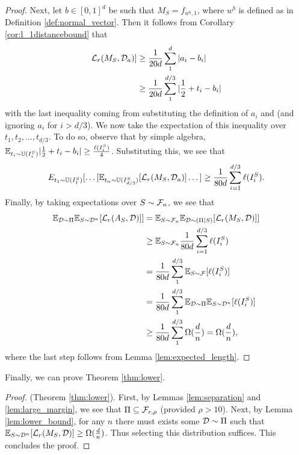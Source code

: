 \begin{proof}
Next, let $b \in [0, 1]^d$ be such that $M_S = f_{w^b, 1}$, where $w^b$ is defined as in Definition \ref{def:normal_vector}. Then it follows from Corollary \ref{cor:l_1distancebound} that 
\begin{equation*}
\begin{split}
\mathcal L_r(M_S, {\mathcal D}_a)] &\geq \frac{1}{20d}\sum_1^d |a_i - b_i| \\
&\geq \frac{1}{20d}\sum_1^{d/3} |\frac{1}{2} + t_i - b_i|
\end{split}
\end{equation*}
with the last inequality coming from substituting the definition of $a_i$ and (and ignoring $a_i$ for $i > d/3$). We now take the expectation of this inequality over $t_1, t_2, \dots, t_{d/3}$. To do so, observe that by simple algebra, ${\mathbb E}_{t_i \sim \mathbb U(I_i^S)} |\frac{1}{2} + t_i - b_i| \geq \frac{\ell(I_i^S)}{4}$. Substituting this, we see that $$E_{t_1 \sim \mathbb U(I_1^S)}[\dots [{\mathbb E}_{t_n \sim \mathbb U(I_{d/3}^S)}[\mathcal L_r(M_S, {\mathcal D}_a)]\dots ] \geq \frac{1}{80d} \sum_{i=1}^{d/3} \ell(I_i^S).$$ Finally, by taking expectations over $S \sim {\mathcal F}_n$, we see that 
\begin{equation*}
\begin{split}
{\mathbb E}_{{\mathcal D} \sim \Pi} {\mathbb E}_{S \sim {\mathcal D}^n}[\mathcal L_r(A_S, {\mathcal D})]] &= {\mathbb E}_{S \sim {\mathcal F}_n} {\mathbb E}_{{\mathcal D} \sim (\Pi|S)}[\mathcal L_r(M_S, {\mathcal D})]] \\
&\geq {\mathbb E}_{S \sim {\mathcal F}_n} \frac{1}{80d} \sum_{i=1}^{d/3} \ell(I_i^S) \\
&= \frac{1}{80d}\sum_1^{d/3}{\mathbb E}_{S \sim {\mathcal F}}[\ell(I_i^S)] \\
&= \frac{1}{80d}\sum_1^{d/3}{\mathbb E}_{{\mathcal D} \sim \Pi}{\mathbb E}_{S \sim {\mathcal D}^n}[\ell(I_i^S)] \\
&\geq \frac{1}{80d}\sum_1^{d/3}\Omega(\frac{d}{n}) = \Omega(\frac{d}{n}),
\end{split}
\end{equation*}
where the last step follows from Lemma \ref{lem:expected_length}. 
\end{proof}

Finally, we can prove Theorem \ref{thm:lower}.

\begin{proof}
(Theorem \ref{thm:lower}). First, by Lemmas \ref{lem:separation} and \ref{lem:large_margin}, we see that $\Pi \subseteq {\mathcal F}_{r, \rho}$ (provided $\rho > 10$). Next, by Lemma \ref{lem:lower_bound}, for any $n$ there must exists some ${\mathcal D} \sim \Pi$ such that ${\mathbb E}_{S \sim {\mathcal D}^n}[\mathcal L_r(M_S, {\mathcal D})] \geq \Omega(\frac{d}{n})$. Thus selecting this distribution suffices. This concludes the proof.
\end{proof}

